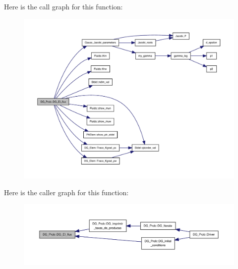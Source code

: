 Here is the call graph for this function\+:
\nopagebreak
\begin{figure}[H]
\begin{center}
\leavevmode
\includegraphics[width=350pt]{classDG__Prob_a68cc239c50661a6856fe3f06b4cdc2c0_cgraph}
\end{center}
\end{figure}
Here is the caller graph for this function\+:
\nopagebreak
\begin{figure}[H]
\begin{center}
\leavevmode
\includegraphics[width=350pt]{classDG__Prob_a68cc239c50661a6856fe3f06b4cdc2c0_icgraph}
\end{center}
\end{figure}
\mbox{\label{classDG__Prob_a0096cd2affdd37f2f3d0e7bc807a7b4b}} 
